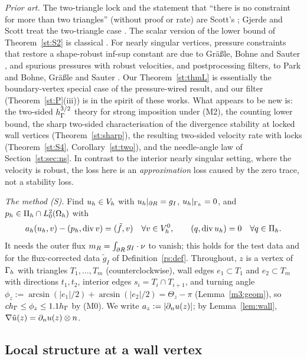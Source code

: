 \emph{Prior art.} The two-triangle lock and the statement that ``there is no constraint for more than two triangles'' (without proof or rate) are Scott's \cite[Theorem~1]{ScottPrize}; Gjerde and Scott treat the two-triangle case \cite[\S3.4, App.~B]{GjerdeScott2024}. The scalar version of the lower bound of Theorem~\ref{st:S2} is classical \cite{BergerScottStrang1972,Scott1975}. For nearly singular vertices, pressure constraints that restore a shape-robust inf-sup constant are due to Gr\"a\ss le, Bohne and Sauter \cite{GrassleBohneSauter2024}, and spurious pressures with robust velocities, and postprocessing filters, to Park \cite{Park2020} and Bohne, Gr\"a\ss le and Sauter \cite{BohneGrassleSauter2025}. Our Theorem~\ref{st:thmL} is essentially the boundary-vertex special case of the pressure-wired result, and our filter (Theorem~\ref{st:P}(iii)) is in the spirit of these works. What appears to be new is: the two-sided $h_\Gamma^{3/2}$ theory for strong imposition under (M2), the counting lower bound, the sharp two-sided characterisation of the divergence stability at locked wall vertices (Theorem~\ref{st:sharp}), the resulting two-sided velocity rate with locks (Theorem~\ref{st:S4}, Corollary~\ref{st:two}), and the needle-angle law of Section~\ref{st:sec:ns}. In contrast to the interior nearly singular setting, where the velocity is robust, the loss here is an \emph{approximation} loss caused by the zero trace, not a stability loss.

\emph{The method (S).} Find $u_h\in V_h$ with $u_h|_{\partial R}=g_I$, $u_h|_{\Gamma_h}=0$, and $p_h\in\Pi_h\cap L^2_0(\Omega_h)$ with
\[
a_h(u_h,v)-(p_h,\operatorname{div} v)=(\tilde f,v)\quad\forall v\in V_h^0,\qquad (q,\operatorname{div} u_h)=0\quad\forall q\in\Pi_h .
\]
It needs the outer flux $m_R=\int_{\partial R}g_I\cdot\nu$ to vanish; this holds for the test data and for the flux-corrected data $\tilde g_I$ of Definition~\ref{rs:def}. Throughout, $z$ is a vertex of $\Gamma_h$ with triangles $T_1,\dots,T_m$ (counterclockwise), wall edges $e_1\subset T_1$ and $e_2\subset T_m$ with directions $t_1,t_2$, interior edges $s_i=T_i\cap T_{i+1}$, and turning angle $\phi_z:=\arcsin(|e_1|/2)+\arcsin(|e_2|/2)=\Theta_z-\pi$ (Lemma~\ref{m3:geom}), so $ch_\Gamma\le\phi_z\le1.1h_\Gamma$ by (M0). We write $a_z:=|\partial_n u(z)|$; by Lemma~\ref{lem:wall}, $\nabla\tilde u(z)=\partial_n u(z)\otimes n$.

\subsection{Local structure at a wall vertex}\label{st:sec:local}

